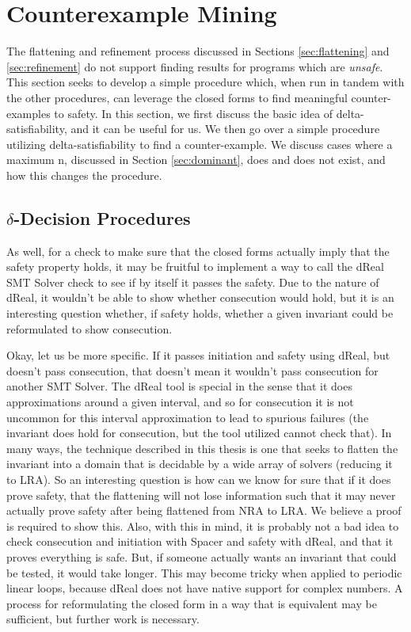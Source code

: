 \section{Counterexample Mining}
\label{sec:cegar}

The flattening and refinement process discussed in Sections \ref{sec:flattening} and \ref{sec:refinement} do not support finding results for programs which are \textit{unsafe}. This section seeks to develop a simple procedure which, when run in tandem with the other procedures, can leverage the closed forms to find meaningful counter-examples to safety. In this section, we first discuss the basic idea of delta-satisfiability, and it can be useful for us. We then go over a simple procedure utilizing delta-satisfiability to find a counter-example. We discuss cases where a maximum n, discussed in Section \ref{sec:dominant}, does and does not exist, and how this changes the procedure.

\subsection{$\delta$-Decision Procedures}
As well, for a check to make sure that the closed forms actually imply that the safety property holds, it may be fruitful to implement a way to call the dReal SMT Solver \cite{gao2013dreal} check to see if by itself it passes the safety. Due to the nature of dReal, it wouldn't be able to show whether consecution would hold, but it is an interesting question whether, if safety holds, whether a given invariant could be reformulated to show consecution.

Okay, let us be more specific. If it passes initiation and safety using dReal, but doesn't pass consecution, that doesn't mean it wouldn't pass consecution for another SMT Solver. The dReal tool is special in the sense that it does approximations around a given interval, and so for consecution it is not uncommon for this interval approximation to lead to spurious failures (the invariant does hold for consecution, but the tool utilized cannot check that). In many ways, the technique described in this thesis is one that seeks to flatten the invariant into a domain that is decidable by a wide array of solvers (reducing it to LRA). So an interesting question is how can we know for sure that if it does prove safety, that the flattening will not lose information such that it may never actually prove safety after being flattened from NRA to LRA. We believe a proof is required to show this. Also, with this in mind, it is probably not a bad idea to check consecution and initiation with Spacer and safety with dReal, and that it proves everything is safe. But, if someone actually wants an invariant that could be tested, it would take longer. This may become tricky when applied to periodic linear loops, because dReal does not have native support for complex numbers. A process for reformulating the closed form in a way that is equivalent may be sufficient, but further work is necessary.

